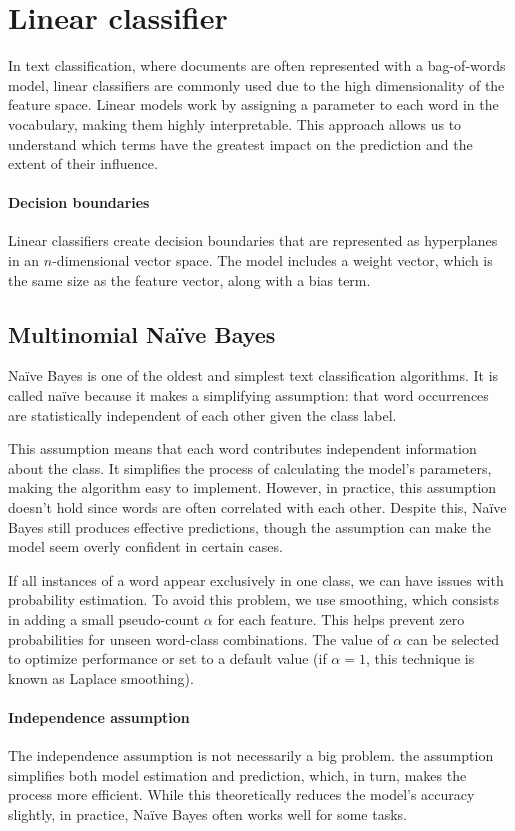\section{Linear classifier}

In text classification, where documents are often represented with a bag-of-words model, linear classifiers are commonly used due to the high dimensionality of the feature space.
Linear models work by assigning a parameter to each word in the vocabulary, making them highly interpretable.
This approach allows us to understand which terms have the greatest impact on the prediction and the extent of their influence.

\paragraph*{Decision boundaries}
Linear classifiers create decision boundaries that are represented as hyperplanes in an $n$-dimensional vector space.
The model includes a weight vector, which is the same size as the feature vector, along with a bias term.

\subsection{Multinomial Naïve Bayes}
Naïve Bayes is one of the oldest and simplest text classification algorithms.
It is called naïve because it makes a simplifying assumption: that word occurrences are statistically independent of each other given the class label.

This assumption means that each word contributes independent information about the class.
It simplifies the process of calculating the model's parameters, making the algorithm easy to implement.
However, in practice, this assumption doesn't hold since words are often correlated with each other. 
Despite this, Naïve Bayes still produces effective predictions, though the assumption can make the model seem overly confident in certain cases.

If all instances of a word appear exclusively in one class, we can have issues with probability estimation.
To avoid this problem, we use smoothing, which consists in adding a small pseudo-count $\alpha$ for each feature.
This helps prevent zero probabilities for unseen word-class combinations. 
The value of $\alpha$ can be selected to optimize performance or set to a default value (if $\alpha = 1$, this technique is known as Laplace smoothing).

\paragraph*{Independence assumption}
The independence assumption is not necessarily a big problem. 
the assumption simplifies both model estimation and prediction, which, in turn, makes the process more efficient. 
While this theoretically reduces the model's accuracy slightly, in practice, Naïve Bayes often works well for some tasks.

